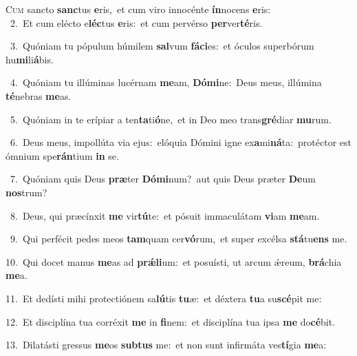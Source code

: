 \lettrine{\initial\textcolor{\initialcolor}{C}}{um} sancto \textbf{sanc}\-tus \textbf{e}\-ris,~\star et cum viro innocénte \textbf{ín}\-nocens \textbf{e}\-ris:\\
{\numbfont\textcolor{\numbcolor}{~2.}}~Et cum elécto e\-\textbf{léc}\-tus \textbf{e}\-ris:~\star et cum pervérso \textbf{per}\-ver\-\textbf{té}\-ris.\par
{\numbfont\textcolor{\numbcolor}{~3.}}~Quóniam tu pópulum húmilem \textbf{sal}\-vum \textbf{fá}\-\textbf{ci}es:~\star et óculos superbórum hu\-\textbf{mi}\-li\-\textbf{á}\-bis.\par
{\numbfont\textcolor{\numbcolor}{~4.}}~Quóniam tu illúminas lucérnam \textbf{me}\-am, \textbf{Dó}\-\textbf{mi}ne:~\star Deus meus, illúmina \textbf{té}\-nebras \textbf{me}\-as.\par
{\numbfont\textcolor{\numbcolor}{~5.}}~Quóniam in te erípiar a ten\-\textbf{ta}\-ti\-\textbf{ó}\-ne,~\star et in Deo meo trans\-\textbf{gré}\-diar \textbf{mu}\-rum.\par
{\numbfont\textcolor{\numbcolor}{~6.}}~Deus meus, impollúta via ejus:~\dagger elóquia Dómini igne ex\-\textbf{a}\-mi\-\textbf{ná}\-ta:~\star protéctor est ómnium spe\-\textbf{rán}\-tium \textbf{in} se.\par
{\numbfont\textcolor{\numbcolor}{~7.}}~Quóniam quis Deus \textbf{præ}\-ter \textbf{Dó}\-\textbf{mi}num?~\star aut quis Deus præter \textbf{De}\-um \textbf{nos}\-trum?\par
{\numbfont\textcolor{\numbcolor}{~8.}}~Deus, qui præcínxit \textbf{me} vir\-\textbf{tú}\-te:~\star et pósuit immaculátam \textbf{vi}\-am \textbf{me}\-am.\par
{\numbfont\textcolor{\numbcolor}{~9.}}~Qui perfécit pedes meos \textbf{tam}\-quam cer\-\textbf{vó}\-rum,~\star et super excélsa \textbf{stá}\-tu\textbf{ens} me.\par
{\numbfont\textcolor{\numbcolor}{10.}}~Qui docet manus \textbf{me}\-as ad \textbf{prǽ}\-\textbf{li}um:~\star et posuísti, ut arcum ǽreum, \textbf{brá}\-chia \textbf{me}\-a.\par
{\numbfont\textcolor{\numbcolor}{11.}}~Et dedísti mihi protectiónem sa\-\textbf{lú}\-tis \textbf{tu}\-æ:~\star et déxtera \textbf{tu}\-a su\-\textbf{scé}\-pit me:\par
{\numbfont\textcolor{\numbcolor}{12.}}~Et disciplína tua corréxit \textbf{me} in \textbf{fi}\-nem:~\star et disciplína tua ipsa \textbf{me} do\-\textbf{cé}\-bit.\par
{\numbfont\textcolor{\numbcolor}{13.}}~Dilatásti gressus \textbf{me}\-os \textbf{sub}\-\textbf{tus} me:~\star et non sunt infirmáta ves\-\textbf{tí}\-gia \textbf{me}\-a:\par
